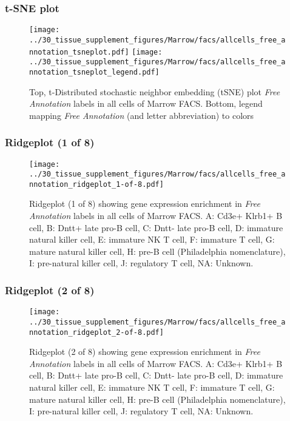 \clearpage
\subsubsection{t-SNE plot}
\begin{figure}[h]
\centering
\texttt{[image: ../30\_tissue\_supplement\_figures/Marrow/facs/allcells\_free\_annotation\_tsneplot.pdf]}
\texttt{[image: ../30\_tissue\_supplement\_figures/Marrow/facs/allcells\_free\_annotation\_tsneplot\_legend.pdf]}
\caption{Top, t-Distributed stochastic neighbor embedding (tSNE) plot  \emph{Free Annotation} labels in all cells of Marrow FACS. Bottom, legend mapping \emph{Free Annotation} (and letter abbreviation) to colors}
\end{figure}


\clearpage

\subsubsection{Ridgeplot (1 of 8)}
\begin{figure}[h]
\centering
\texttt{[image: ../30\_tissue\_supplement\_figures/Marrow/facs/allcells\_free\_annotation\_ridgeplot\_1-of-8.pdf]}

\caption{ Ridgeplot (1 of 8)  showing gene expression enrichment in \emph{Free Annotation} labels in all cells of Marrow FACS. A: Cd3e+ Klrb1+ B cell, B: Dntt+ late pro-B cell, C: Dntt- late pro-B cell, D: immature natural killer cell, E: immature NK T cell, F: immature T cell, G: mature natural killer cell, H: pre-B cell (Philadelphia nomenclature), I: pre-natural killer cell, J: regulatory T cell, NA: Unknown.}
\end{figure}


\clearpage

\subsubsection{Ridgeplot (2 of 8)}
\begin{figure}[h]
\centering
\texttt{[image: ../30\_tissue\_supplement\_figures/Marrow/facs/allcells\_free\_annotation\_ridgeplot\_2-of-8.pdf]}

\caption{ Ridgeplot (2 of 8)  showing gene expression enrichment in \emph{Free Annotation} labels in all cells of Marrow FACS. A: Cd3e+ Klrb1+ B cell, B: Dntt+ late pro-B cell, C: Dntt- late pro-B cell, D: immature natural killer cell, E: immature NK T cell, F: immature T cell, G: mature natural killer cell, H: pre-B cell (Philadelphia nomenclature), I: pre-natural killer cell, J: regulatory T cell, NA: Unknown.}
\end{figure}


